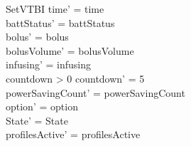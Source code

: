 \begin{schema}{SetVTBI}
	time' = time\\
	battStatus' = battStatus\\
	bolus' = bolus\\
	bolusVolume' = bolusVolume\\
	infusing' = infusing\\
	countdown > 0 \land countdown' = 5\\
	powerSavingCount' = powerSavingCount\\ 
	option' = option\\
	State' = State\\
	profilesActive' = profilesActive
\end{schema}

